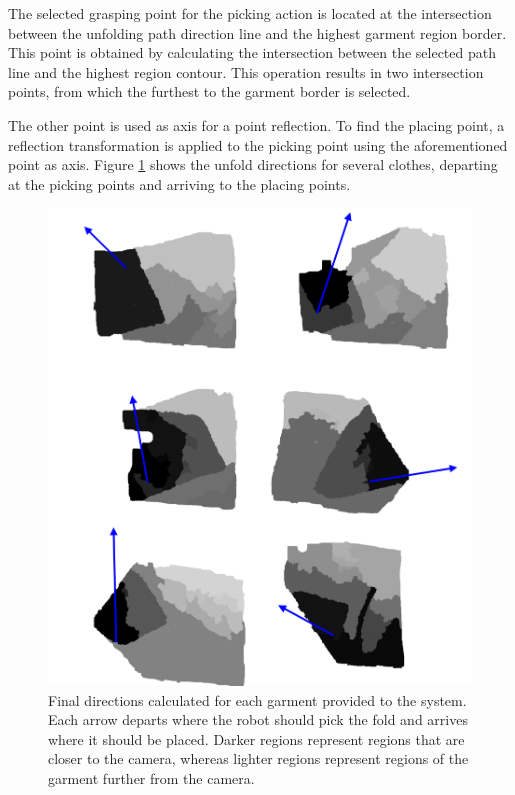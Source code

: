 The selected grasping point for the picking action is located at the intersection between the unfolding path direction line and the highest garment region border. This point is obtained by calculating the intersection between the selected path line and the highest region contour. This operation results in two intersection points, from which the furthest to the garment border is selected.

The other point is used as axis for a point reflection. To find the placing point, a reflection transformation is applied to the picking point using the aforementioned point as axis. Figure \ref{fig:directions} shows the unfold directions for several clothes, departing at the picking points and arriving to the placing points.

\begin{figure}[thpb]
    \centering
    \includegraphics[width=\textwidth]
    {figures/directions.pdf}
    \caption{Final directions calculated for each garment provided to the system. Each arrow departs where the robot should pick the fold and arrives where it should be placed. Darker regions represent regions that are closer to the camera, whereas lighter regions represent regions of the garment further from the camera.}
    \label{fig:directions}
\end{figure}


